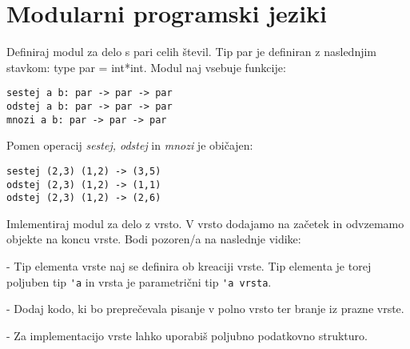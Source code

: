 \chapter{Modularni programski jeziki}





\begin{ex}
Definiraj modul za delo s pari celih \v stevil. Tip par je definiran z
naslednjim stavkom: type par = int*int. Modul naj vsebuje funkcije:

\begin{lstlisting}
sestej a b: par -> par -> par
odstej a b: par -> par -> par
mnozi a b: par -> par -> par
\end{lstlisting}
Pomen operacij \emph{sestej, odstej} in \emph{mnozi} je obi\v cajen:
\begin{lstlisting}
sestej (2,3) (1,2) -> (3,5)
odstej (2,3) (1,2) -> (1,1)
odstej (2,3) (1,2) -> (2,6)
\end{lstlisting}
\end{ex}



\begin{ex}
Imlementiraj modul za delo z vrsto. V vrsto dodajamo na za\v cetek in
odvzemamo objekte na koncu vrste. Bodi pozoren/a na naslednje vidike:

- Tip elementa vrste naj se definira ob kreaciji vrste. Tip elementa
  je torej poljuben tip \lstinline{'a} in vrsta je parametri\v cni tip \lstinline{'a vrsta}.
  
- Dodaj kodo, ki bo prepre\v cevala pisanje v polno vrsto ter branje iz
  prazne vrste.
  
- Za implementacijo vrste lahko uporabi\v s poljubno podatkovno strukturo.
\end{ex}



